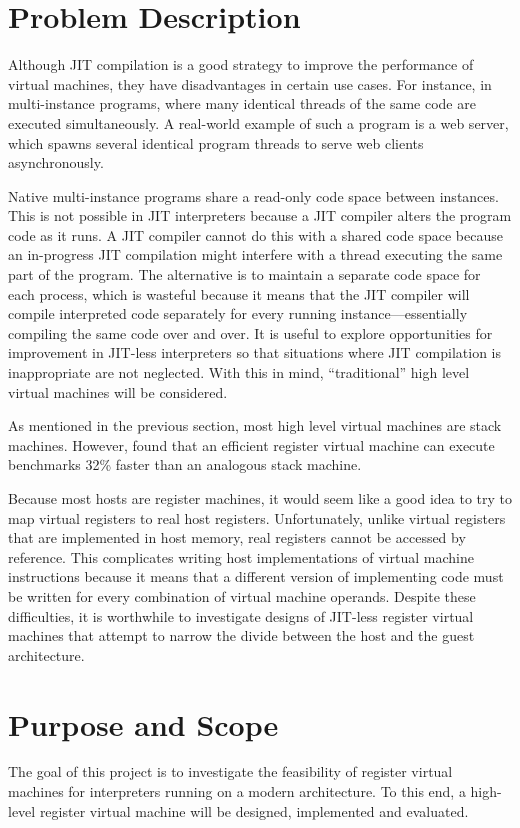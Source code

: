 	\section{Problem Description}
		Although JIT compilation is a good strategy to improve the performance of virtual machines, they have disadvantages in certain use cases. For instance, in multi-instance programs, where many identical threads of the same code are executed simultaneously. A real-world example of such a program is a web server, which spawns several identical program threads to serve web clients asynchronously.
		
		Native multi-instance programs share a read-only code space between instances. This is not possible in JIT interpreters because a JIT compiler alters the program code as it runs. A JIT compiler cannot do this with a shared code space because an in-progress JIT compilation might interfere with a thread executing the same part of the program. The alternative is to maintain a separate code space for each process, which is wasteful because it means that the JIT compiler will compile interpreted code separately for every running instance---essentially compiling the same code over and over. It is useful to explore opportunities for improvement in JIT-less interpreters so that situations where JIT compilation is inappropriate are not neglected. With this in mind, ``traditional'' high level virtual machines will be considered.
		
		As mentioned in the previous section, most high level virtual machines are stack machines. However, \cite{stackregistershowdown} found that an efficient register virtual machine can execute benchmarks 32\% faster than an analogous stack machine. 
		
		Because most hosts are register machines, it would seem like a good idea to try to map virtual registers to real host registers. Unfortunately, unlike virtual registers that are implemented in host memory, real registers cannot be accessed by reference.  This complicates writing host implementations of virtual machine instructions because it means that a different version of implementing code must be written for every combination of virtual machine operands. Despite these difficulties, it is worthwhile to investigate designs of JIT-less register virtual machines that attempt to narrow the divide between the host and the guest architecture.
	
	\section{Purpose and Scope}
		The goal of this project is to investigate the feasibility of register virtual machines for interpreters running on a modern architecture. To this end, a high-level register virtual machine will be designed, implemented and evaluated.
	
